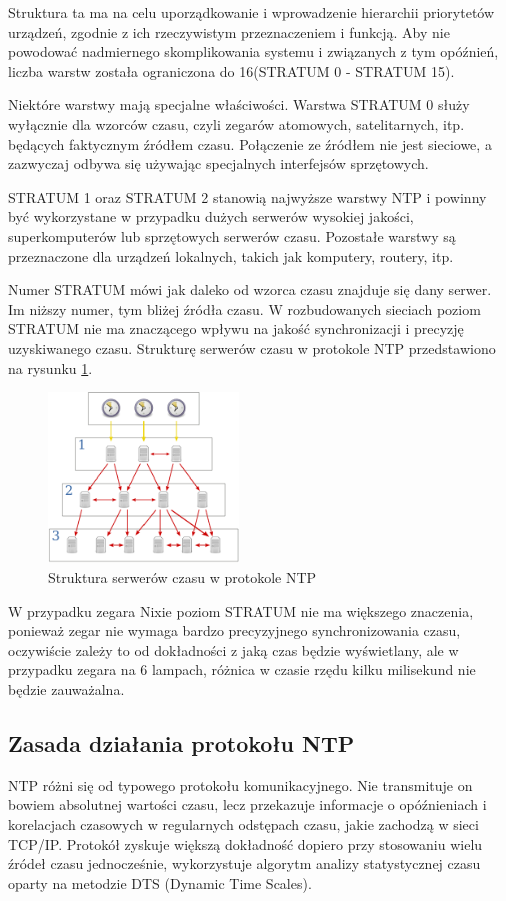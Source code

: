 \documentclass[../main.tex]{subfiles}
\begin{document}
Struktura ta ma na celu uporządkowanie i wprowadzenie hierarchii priorytetów urządzeń, zgodnie z ich rzeczywistym przeznaczeniem i funkcją. 
Aby nie powodować nadmiernego skomplikowania systemu i związanych z tym opóźnień, liczba warstw została ograniczona do 16(STRATUM 0 - STRATUM 15).

Niektóre warstwy mają specjalne właściwości. Warstwa STRATUM 0 służy wyłącznie dla wzorców czasu, czyli zegarów atomowych, satelitarnych, itp. będących faktycznym źródłem czasu.
Połączenie ze źródłem nie jest sieciowe, a zazwyczaj odbywa się używając specjalnych interfejsów sprzętowych.

STRATUM 1 oraz STRATUM 2 stanowią najwyższe warstwy NTP i powinny być wykorzystane w przypadku dużych serwerów
wysokiej jakości, superkomputerów lub sprzętowych serwerów czasu.
Pozostałe warstwy są przeznaczone dla urządzeń lokalnych, takich jak komputery, routery, itp.

Numer STRATUM mówi jak daleko od wzorca czasu znajduje się dany serwer. Im niższy numer, tym bliżej źródła czasu. 
W rozbudowanych sieciach poziom STRATUM nie ma znaczącego wpływu na jakość synchronizacji i precyzję uzyskiwanego czasu.
Strukturę serwerów czasu w protokole NTP przedstawiono na rysunku \ref{fig:serwers}.

\begin{figure}[H]
  \centering
  \includegraphics[width=0.45\textwidth]{serwers.png}
  \caption{Struktura serwerów czasu w protokole 
  NTP \cite{st:serwerczasu-jpg}}
  \label{fig:serwers}
\end{figure}

W przypadku zegara Nixie poziom STRATUM nie ma większego znaczenia, ponieważ zegar nie wymaga bardzo precyzyjnego synchronizowania czasu, oczywiście zależy to 
od dokładności z jaką czas będzie wyświetlany, ale w przypadku zegara na 6 lampach, różnica w czasie rzędu kilku milisekund nie będzie zauważalna.

\subsection{Zasada działania protokołu NTP}
NTP różni się od typowego protokołu komunikacyjnego. 
Nie transmituje on bowiem absolutnej wartości czasu, lecz przekazuje informacje o opóźnieniach i korelacjach czasowych w regularnych odstępach czasu, jakie zachodzą w sieci TCP/IP. 
Protokół zyskuje większą dokładność dopiero przy stosowaniu wielu źródeł czasu jednocześnie, wykorzystuje algorytm analizy statystycznej czasu oparty na metodzie DTS (Dynamic Time Scales).
\end{document}
